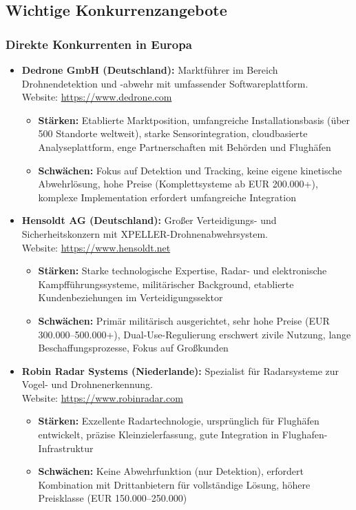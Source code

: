 \documentclass[11pt,a4paper]{article}
\begin{document}
\subsection{Wichtige Konkurrenzangebote}

\subsubsection*{Direkte Konkurrenten in Europa}

\begin{itemize}
    \item \textbf{Dedrone GmbH (Deutschland):} Marktführer im Bereich Drohnendetektion und -abwehr mit umfassender Softwareplattform. \\
    Website: \url{https://www.dedrone.com}
    \begin{itemize}
        \item \textbf{Stärken:} Etablierte Marktposition, umfangreiche Installationsbasis (über 500 Standorte weltweit), 
        starke Sensorintegration, cloudbasierte Analyseplattform, enge Partnerschaften mit Behörden und Flughäfen
        \item \textbf{Schwächen:} Fokus auf Detektion und Tracking, keine eigene kinetische Abwehrlösung, hohe Preise 
        (Komplettsysteme ab EUR 200.000+), komplexe Implementation erfordert umfangreiche Integration
    \end{itemize}
    
    \item \textbf{Hensoldt AG (Deutschland):} Großer Verteidigungs- und Sicherheitskonzern mit XPELLER-Drohnenabwehrsystem. \\
    Website: \url{https://www.hensoldt.net}
    \begin{itemize}
        \item \textbf{Stärken:} Starke technologische Expertise, Radar- und elektronische Kampfführungssysteme, 
        militärischer Background, etablierte Kundenbeziehungen im Verteidigungssektor
        \item \textbf{Schwächen:} Primär militärisch ausgerichtet, sehr hohe Preise (EUR 300.000–500.000+), 
        Dual-Use-Regulierung erschwert zivile Nutzung, lange Beschaffungsprozesse, Fokus auf Großkunden
    \end{itemize}
    
    \item \textbf{Robin Radar Systems (Niederlande):} Spezialist für Radarsysteme zur Vogel- und Drohnenerkennung. \\
    Website: \url{https://www.robinradar.com}
    \begin{itemize}
        \item \textbf{Stärken:} Exzellente Radartechnologie, ursprünglich für Flughäfen entwickelt, 
        präzise Kleinzielerfassung, gute Integration in Flughafen-Infrastruktur
        \item \textbf{Schwächen:} Keine Abwehrfunktion (nur Detektion), erfordert Kombination mit Drittanbietern 
        für vollständige Lösung, höhere Preisklasse (EUR 150.000–250.000)
    \end{itemize}
    

\end{itemize}
\end{document}
